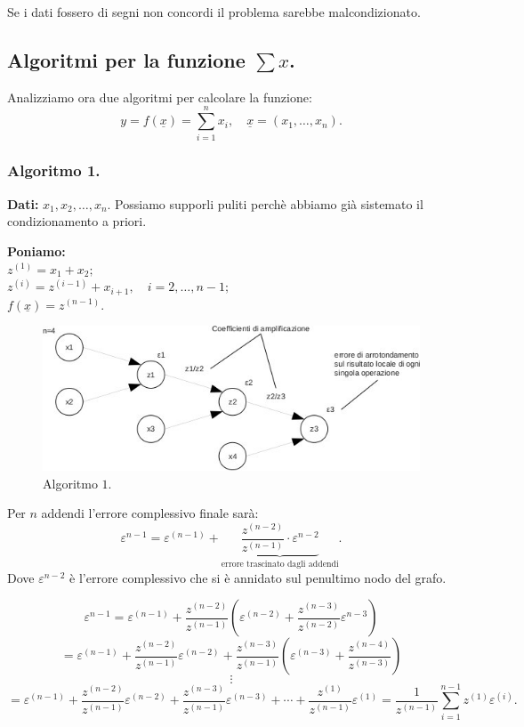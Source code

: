 Se i dati fossero di segni non concordi il problema sarebbe malcondizionato.

\subsection{Algoritmi per la funzione $\sum x$.}
Analizziamo ora due algoritmi per calcolare la funzione:
\[y = f(\underline{x}) = \sum_{i=1}^nx_i, 
\quad \underline{x} = (x_1, \ldots, x_n).\]

\subsubsection{Algoritmo 1.}
\textbf{Dati:} $x_1, x_2, \ldots, x_n$. Possiamo supporli puliti perchè 
abbiamo già sistemato il condizionamento a priori.
\begin{flushleft}\samepage
\textbf{Poniamo:}\\
$z^{(1)} = x_1 + x_2;$\\
$z^{(i)} = z^{(i-1)} + x_{i+1}, \quad i = 2, \ldots, n-1;$\\
$f(\underline{x}) = z^{(n-1)}.$
\begin{figure}[!ht]
\includegraphics{fig/algoritmo1.jpg}
\caption{Algoritmo $1$.}
\end{figure}
\end{flushleft}
Per $n$ addendi l'errore complessivo finale sarà:
\[
\varepsilon^{n-1}= \varepsilon^{(n-1)} + \underbrace{\frac{z^{(n-2)}}{z^{(n-1)}}
\cdot\varepsilon^{n-2}}_{\textrm{errore trascinato dagli addendi}}.
\]
Dove $\varepsilon^{n-2}$ è l'errore complessivo che si è annidato sul 
penultimo nodo del grafo.

\[\varepsilon^{n-1}=\varepsilon^{(n-1)} + \frac{z^{(n-2)}}{z^{(n-1)}} \left(
\varepsilon^{(n-2)} +\frac{z^{(n-3)}}{z^{(n-2)}}\varepsilon^{n-3} \right)\]
\[= \varepsilon^{(n-1)} + \frac{z^{(n-2)}}{z^{(n-1)}}\varepsilon^{(n-2)} +
\frac{z^{(n-3)}}{z^{(n-1)}}\left(\varepsilon^{(n-3)} + \frac{z^{(n-4)}}{z^{(n-3)}}
\right)\]
\[\vdots\]
\[= \varepsilon^{(n-1)} + \frac{z^{(n-2)}}{z^{(n-1)}}\varepsilon^{(n-2)} +
\frac{z^{(n-3)}}{z^{(n-1)}}\varepsilon^{(n-3)} + \cdots + \frac{z^{(1)}}{z^{(n-1)}}
\varepsilon^{(1)} = \frac{1}{z^{(n-1)}}\sum_{i=1}^{n-1}z^{(1)}\varepsilon^{(i)}.
\]

